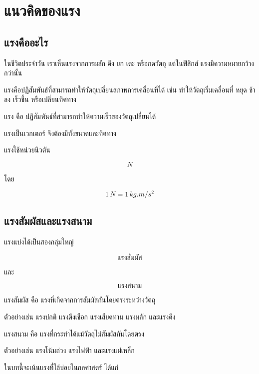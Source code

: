 \newpage{}

\section{แนวคิดของแรง}

\subsection{แรงคืออะไร}

ในชีวิตประจำวัน เราเห็นแรงจากการผลัก ดึง ยก เตะ หรือกดวัตถุ แต่ในฟิสิกส์ แรงมีความหมายกว้างกว่านั้น

แรงคือปฏิสัมพันธ์ที่สามารถทำให้วัตถุเปลี่ยนสภาพการเคลื่อนที่ได้ เช่น ทำให้วัตถุเริ่มเคลื่อนที่ หยุด ช้าลง เร็วขึ้น หรือเปลี่ยนทิศทาง

\begin{tcolorbox}[title=นิยาม]
แรง คือ ปฏิสัมพันธ์ที่สามารถทำให้ความเร็วของวัตถุเปลี่ยนได้

แรงเป็นเวกเตอร์ จึงต้องมีทั้งขนาดและทิศทาง
\end{tcolorbox}

แรงใช้หน่วยนิวตัน

\[
\si{N}
\]

โดย

\[
1\,\si{N}=1\,\si{kg.m/s^2}
\]

\subsection{แรงสัมผัสและแรงสนาม}

แรงแบ่งได้เป็นสองกลุ่มใหญ่

\[
\text{แรงสัมผัส}
\]

และ

\[
\text{แรงสนาม}
\]

\begin{tcolorbox}[title=แรงสัมผัส]
แรงสัมผัส คือ แรงที่เกิดจากการสัมผัสกันโดยตรงระหว่างวัตถุ

ตัวอย่างเช่น แรงปกติ แรงตึงเชือก แรงเสียดทาน แรงผลัก และแรงดึง
\end{tcolorbox}

\begin{tcolorbox}[title=แรงสนาม]
แรงสนาม คือ แรงที่กระทำได้แม้วัตถุไม่สัมผัสกันโดยตรง

ตัวอย่างเช่น แรงโน้มถ่วง แรงไฟฟ้า และแรงแม่เหล็ก
\end{tcolorbox}

ในบทนี้จะเน้นแรงที่ใช้บ่อยในกลศาสตร์ ได้แก่

